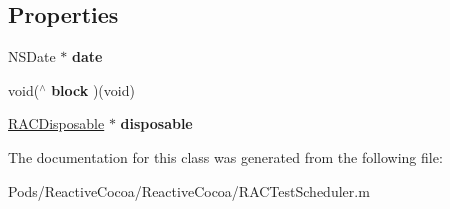 \subsection*{Properties}
\begin{DoxyCompactItemize}
\item 
\mbox{\label{interface_r_a_c_test_scheduler_action_af2b171d7ed13c5ce778902b2389c8fca}} 
N\+S\+Date $\ast$ {\bfseries date}
\item 
\mbox{\label{interface_r_a_c_test_scheduler_action_ab170bf4ad051714eb1f23ba65ef492e0}} 
void($^\wedge$ {\bfseries block} )(void)
\item 
\mbox{\label{interface_r_a_c_test_scheduler_action_a90de7d714ec64142dc23e7521af6dc3f}} 
\mbox{\hyperlink{interface_r_a_c_disposable}{R\+A\+C\+Disposable}} $\ast$ {\bfseries disposable}
\end{DoxyCompactItemize}


The documentation for this class was generated from the following file\+:\begin{DoxyCompactItemize}
\item 
Pods/\+Reactive\+Cocoa/\+Reactive\+Cocoa/R\+A\+C\+Test\+Scheduler.\+m\end{DoxyCompactItemize}
